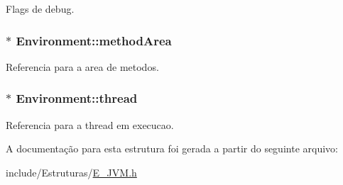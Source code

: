 Flags de debug. 

\hypertarget{struct_environment_a1c73c41c6c38e7e67ea22f6d59044852}{}
\subsubsection[{method\+Area}]{$\ast$ Environment\+::method\+Area}\label{struct_environment_a1c73c41c6c38e7e67ea22f6d59044852}


Referencia para a area de metodos. 

\hypertarget{struct_environment_a9521ae1091a45875768bdbbe0a339014}{}
\subsubsection[{thread}]{$\ast$ Environment\+::thread}\label{struct_environment_a9521ae1091a45875768bdbbe0a339014}


Referencia para a thread em execucao. 



A documentação para esta estrutura foi gerada a partir do seguinte arquivo\+:\begin{DoxyCompactItemize}
\item 
include/\+Estruturas/\hyperlink{_e___j_v_m_8h}{E\+\_\+\+J\+V\+M.\+h}\end{DoxyCompactItemize}
